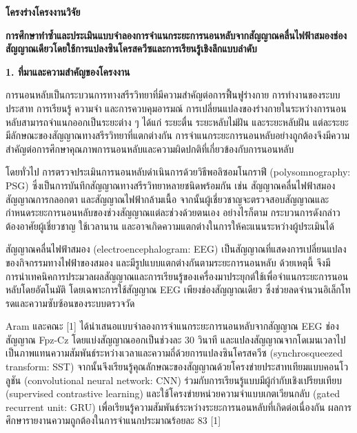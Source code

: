 \documentclass[12pt,a4paper]{article}
\newcommand{\mainsection}[1]{%
  \par\vspace{0.65\baselineskip}%
  \noindent\textbf{#1}\par\nobreak\vspace{0.2\baselineskip}%
}
\begin{document}
\fontsize{16}{20}\selectfont
\onehalfspacing

\begin{center}
  {\fontsize{18}{22}\selectfont\bfseries โครงร่างโครงงานวิจัย}\par
  \vspace{0.65\baselineskip}
  {\fontsize{17}{21}\selectfont\bfseries
  การศึกษาทำซ้ำและประเมินแบบจำลองการจำแนกระยะการนอนหลับจากสัญญาณคลื่นไฟฟ้าสมองช่องสัญญาณเดียวโดยใช้การแปลงซินโครสควีซและการเรียนรู้เชิงลึกแบบลำดับ}
\end{center}

\mainsection{1. ที่มาและความสำคัญของโครงงาน}

การนอนหลับเป็นกระบวนการทางสรีรวิทยาที่มีความสำคัญต่อการฟื้นฟูร่างกาย การทำงานของระบบประสาท การเรียนรู้ ความจำ และการควบคุมอารมณ์ การเปลี่ยนแปลงของร่างกายในระหว่างการนอนหลับสามารถจำแนกออกเป็นระยะต่าง ๆ ได้แก่ ระยะตื่น ระยะหลับไม่ฝัน และระยะหลับฝัน แต่ละระยะมีลักษณะของสัญญาณทางสรีรวิทยาที่แตกต่างกัน การจำแนกระยะการนอนหลับอย่างถูกต้องจึงมีความสำคัญต่อการศึกษาคุณภาพการนอนหลับและความผิดปกติที่เกี่ยวข้องกับการนอนหลับ

โดยทั่วไป การตรวจประเมินการนอนหลับดำเนินการด้วยวิธีพอลิซอมโนกราฟี (polysomnography: PSG) ซึ่งเป็นการบันทึกสัญญาณทางสรีรวิทยาหลายชนิดพร้อมกัน เช่น สัญญาณคลื่นไฟฟ้าสมอง สัญญาณการกลอกตา และสัญญาณไฟฟ้ากล้ามเนื้อ จากนั้นผู้เชี่ยวชาญจะตรวจสอบสัญญาณและกำหนดระยะการนอนหลับของช่วงสัญญาณแต่ละช่วงด้วยตนเอง อย่างไรก็ตาม กระบวนการดังกล่าวต้องอาศัยผู้เชี่ยวชาญ ใช้เวลานาน และอาจเกิดความแตกต่างในการให้คะแนนระหว่างผู้ประเมินได้

สัญญาณคลื่นไฟฟ้าสมอง (electroencephalogram: EEG) เป็นสัญญาณที่แสดงการเปลี่ยนแปลงของกิจกรรมทางไฟฟ้าของสมอง และมีรูปแบบแตกต่างกันตามระยะการนอนหลับ ด้วยเหตุนี้ จึงมีการนำเทคนิคการประมวลผลสัญญาณและการเรียนรู้ของเครื่องมาประยุกต์ใช้เพื่อจำแนกระยะการนอนหลับโดยอัตโนมัติ โดยเฉพาะการใช้สัญญาณ EEG เพียงช่องสัญญาณเดียว ซึ่งช่วยลดจำนวนอิเล็กโทรดและความซับซ้อนของระบบตรวจวัด

Aram และคณะ [1] ได้นำเสนอแบบจำลองการจำแนกระยะการนอนหลับจากสัญญาณ EEG ช่องสัญญาณ Fpz-Cz โดยแบ่งสัญญาณออกเป็นช่วงละ 30 วินาที และแปลงสัญญาณจากโดเมนเวลาไปเป็นภาพแทนความสัมพันธ์ระหว่างเวลาและความถี่ด้วยการแปลงซินโครสควีซ (synchrosqueezed transform: SST) จากนั้นจึงเรียนรู้คุณลักษณะของสัญญาณด้วยโครงข่ายประสาทเทียมแบบคอนโวลูชัน (convolutional neural network: CNN) ร่วมกับการเรียนรู้แบบมีผู้กำกับเชิงเปรียบเทียบ (supervised contrastive learning) และใช้โครงข่ายหน่วยความจำแบบเกตเวียนกลับ (gated recurrent unit: GRU) เพื่อเรียนรู้ความสัมพันธ์ระหว่างระยะการนอนหลับที่เกิดต่อเนื่องกัน ผลการศึกษารายงานความถูกต้องในการจำแนกประมาณร้อยละ 83 [1]
\end{document}
